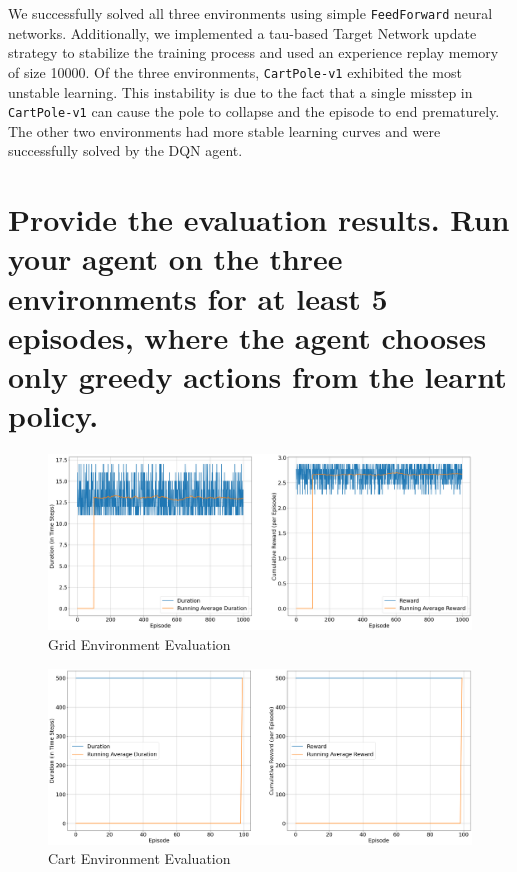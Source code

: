 \documentclass{article} %
\begin{document}
We successfully solved all three environments using simple \verb|FeedForward| neural networks. Additionally, we implemented a tau-based Target Network update strategy to stabilize the training process and used an experience replay memory of size 10000. Of the three environments, \verb|CartPole-v1| exhibited the most unstable learning. This instability is due to the fact that a single misstep in \verb|CartPole-v1| can cause the pole to collapse and the episode to end prematurely. The other two environments had more stable learning curves and were successfully solved by the DQN agent.

\section{Provide the evaluation results. Run your agent on the three environments for at least 5 episodes, where the agent chooses only greedy actions from the learnt policy.}

\begin{figure}[H]
    \begin{center}
        \includegraphics[width=\textwidth]{grid_evaluate_ddqn.png}
    \end{center}
    \caption{Grid Environment Evaluation}
\end{figure}

\begin{figure}[H]
    \begin{center}
        \includegraphics[width=\textwidth]{cart_evaluate.png}
    \end{center}
    \caption{Cart Environment Evaluation}
\end{figure}
\end{document}
